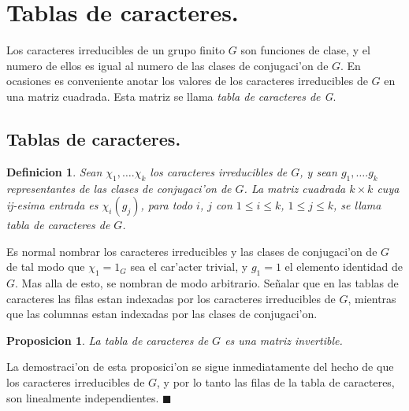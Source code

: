 \documentclass[a4paper,openright,12pt]{book}
\numberwithin{equation}{section} %
\newtheorem{proposicion}{Proposicion}[section] %
\newtheorem{definicion}{Definicion}[section] %
\newenvironment{proof}{\noindent{\it Demostracion:}}{\hfill$\blacksquare$} %
\begin{document}
\section{Tablas de caracteres.}
Los caracteres irreducibles de un grupo finito $G$ son funciones de clase, y el numero de ellos es igual al numero de las clases de conjugaci'on de $G$. En ocasiones es conveniente anotar los valores de los caracteres irreducibles de $G$ en una matriz cuadrada. Esta matriz se llama \emph{tabla de caracteres de G}. 
\subsection{Tablas de caracteres.}
\begin{definicion}
Sean $\chi_{1},\ldots .\chi_{k}$ los caracteres irreducibles de $G$, y sean $g_{1},\ldots .g_{k}$ representantes de las clases de conjugaci'on de $G$. La matriz cuadrada $k \times k$ cuya \emph{ij-esima} entrada es $\chi_{i}(g_{j})$, para todo $i$, $j$ con $1 \leq i \leq k$, $1 \leq j \leq k$, se llama tabla de caracteres de $G$. 
\end{definicion}
Es normal nombrar los caracteres irreducibles y las clases de conjugaci'on de $G$ de tal modo que $\chi_{1}=1_{G}$ sea el car'acter trivial, y $g_{1}=1$ el elemento identidad de $G$. Mas alla de esto, se nombran de modo arbitrario. Se\~nalar que en las tablas de caracteres las filas estan indexadas por los caracteres irreducibles de $G$, mientras que las columnas estan indexadas por las clases de conjugaci'on.
\begin{proposicion}
La tabla de caracteres de $G$ es una matriz invertible.
\end{proposicion}
\begin{proof}
La demostraci'on de esta proposici'on se sigue inmediatamente del hecho de que los caracteres irreducibles de $G$, y por lo tanto las filas de la tabla de caracteres, son linealmente independientes.
\end{proof}
\end{document}
